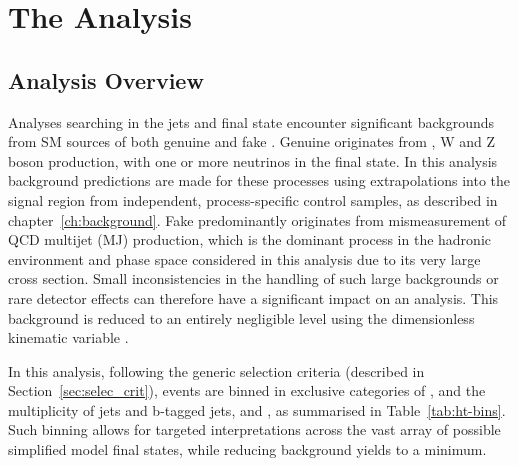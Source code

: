 \chapter{The \alphat Analysis}
\label{ch:analysis}

\ifpdf
    \graphicspath{{Chapter5/Figs/Raster/}{Chapter5/Figs/PDF/}{Chapter5/Figs/}}
\else
    \graphicspath{{Chapter5/Figs/Vector/}{Chapter5/Figs/}}
\fi


\section{Analysis Overview}  %
\label{sec:selection_analysis_overview}

Analyses searching in the jets and \met final state encounter significant 
backgrounds from SM sources of both genuine and fake \met. Genuine \met 
originates from \ttbar, W and Z boson production, with one or more
neutrinos in the final state. In this analysis background predictions are made
for these processes using 
extrapolations into the signal region from independent, process-specific control
samples, as described in chapter~\ref{ch:background}.
Fake \met predominantly originates from mismeasurement of QCD 
multijet (MJ) production, which is the dominant process in the hadronic
environment
and  phase space considered in this analysis due to its very large cross
section.  Small inconsistencies in the handling of such large backgrounds or
rare detector effects can therefore 
have a significant impact on an analysis. This background is reduced to an 
entirely negligible level using the dimensionless kinematic variable \alphat.


In this analysis, following the generic selection criteria (described in
Section~\ref{sec:selec_crit}), events are binned in exclusive categories of \HT, 
and the multiplicity of jets and b-tagged jets,  
\nj and \nb, as summarised in Table~\ref{tab:ht-bins}. Such binning allows for
targeted interpretations across the vast array of
possible simplified model final states, while reducing background yields to a 
minimum.

